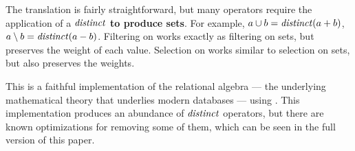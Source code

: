 The translation is fairly straightforward, but many operators require
the application of a $\mathit{distinct}$ \textbf{to produce sets}.  For
example, $a \cup b = \mathit{distinct}(a + b)$, $a \setminus b = \mathit{distinct}(a -
b)$.  Filtering on \zrs works exactly as filtering on sets, but
preserves the weight of each value.  Selection on \zrs works similar
to selection on sets, but also preserves the weights.

%
%
%
%
%
%

This is a faithful implementation of the relational algebra --- the
underlying mathematical theory that underlies modern databases ---
using \zrs.  This implementation produces an abundance of $\mathit{distinct}$
operators, but there are known optimizations for removing some of
them, which can be seen in the full version of this paper.


